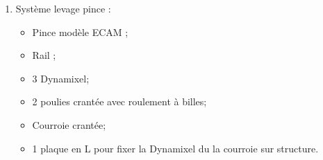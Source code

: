 \begin{enumerate}
	\item Système levage pince : 
	\begin{itemize}
		\item Pince modèle ECAM ;
		\item Rail ;
		\item 3 Dynamixel;
		\item 2 poulies crantée avec roulement à billes;
		\item Courroie crantée;
		\item 1 plaque en L pour fixer la Dynamixel du la courroie sur structure.
	\end{itemize}
\end{enumerate}